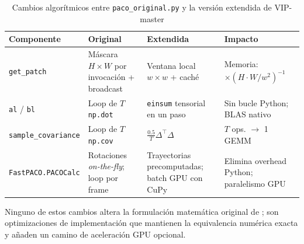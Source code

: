 \begin{table}[H]
\centering
\caption{Cambios algorítmicos entre \texttt{paco\_original.py} y la versión extendida de VIP-master}
\label{tab:paco_diff}
\begin{tabular}{|p{2.8cm}|p{3.5cm}|p{3.5cm}|p{2.8cm}|}
\hline
\textbf{Componente} & \textbf{Original} & \textbf{Extendida} & \textbf{Impacto} \\
\hline
\texttt{get\_patch} & Máscara $H{\times}W$ por invocación + broadcast & Ventana local $w{\times}w$ + caché & Memoria: $\times(H{\cdot}W/w^2)^{-1}$ \\
\hline
\texttt{al} / \texttt{bl} & Loop de $T$ \texttt{np.dot} & \texttt{einsum} tensorial en un paso & Sin bucle Python; BLAS nativo \\
\hline
\texttt{sample\_covariance} & Loop de $T$ \texttt{np.cov} & $\frac{0.5}{T}\Delta^\top\Delta$ & $T$ ops. $\to$ 1 GEMM \\
\hline
\texttt{FastPACO.PACOCalc} & Rotaciones \textit{on-the-fly}; loop por frame & Trayectorias precomputadas; batch GPU con CuPy & Elimina overhead Python; paralelismo GPU \\
\hline
\end{tabular}
\end{table}

Ninguno de estos cambios altera la formulación matemática original de \citet{Flasseur_2018}; son optimizaciones de implementación que mantienen la equivalencia numérica exacta y añaden un camino de aceleración GPU opcional.
